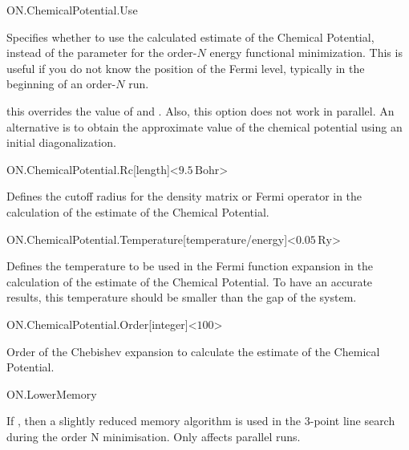 \begin{fdflogicalF}{ON.ChemicalPotential.Use}

  Specifies whether to use the calculated estimate of the Chemical
  Potential, instead of the parameter
   for the
  order-$N$ energy functional minimization.  This is useful if
  you do not know the position of the Fermi level, typically in the
  beginning of an order-$N$ run.

  \note this overrides the value of  and .
  Also, this option does not work in parallel. An alternative
  is to obtain the approximate value of the chemical potential using
  an initial diagonalization.
  
\end{fdflogicalF}

\begin{fdfentry}{ON.ChemicalPotential.Rc}[length]<$9.5\,\mathrm{Bohr}$>

  Defines the cutoff radius for the density matrix or Fermi operator
  in the calculation of the estimate of the Chemical Potential.

\end{fdfentry}

\begin{fdfentry}{ON.ChemicalPotential.Temperature}[temperature/energy]<$0.05\,\mathrm{Ry}$>

  Defines the temperature to be used in the Fermi function expansion
  in the calculation of the estimate of the Chemical Potential.  To
  have an accurate results, this temperature should be smaller than
  the gap of the system.

\end{fdfentry}

\begin{fdfentry}{ON.ChemicalPotential.Order}[integer]<$100$>

  Order of the Chebishev expansion to calculate the estimate of the
  Chemical Potential.

\end{fdfentry}

\begin{fdflogicalF}{ON.LowerMemory}

  If \fdftrue, then a slightly reduced memory algorithm is used in the
  3-point line search during the order N minimisation. Only affects
  parallel runs.

\end{fdflogicalF}



